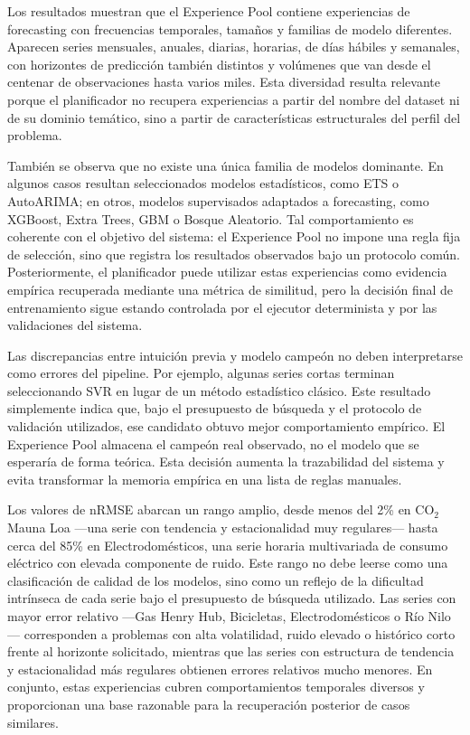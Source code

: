 \documentclass[12pt,a4paper]{article}
\theoremstyle{plain}
\begin{document}
Los resultados muestran que el Experience Pool contiene experiencias de forecasting con frecuencias temporales, tamaños y familias de modelo diferentes. Aparecen series mensuales, anuales, diarias, horarias, de días hábiles y semanales, con horizontes de predicción también distintos y volúmenes que van desde el centenar de observaciones hasta varios miles. Esta diversidad resulta relevante porque el planificador no recupera experiencias a partir del nombre del dataset ni de su dominio temático, sino a partir de características estructurales del perfil del problema.

También se observa que no existe una única familia de modelos dominante. En algunos casos resultan seleccionados modelos estadísticos, como ETS o AutoARIMA; en otros, modelos supervisados adaptados a forecasting, como XGBoost, Extra Trees, GBM o Bosque Aleatorio. Tal comportamiento es coherente con el objetivo del sistema: el Experience Pool no impone una regla fija de selección, sino que registra los resultados observados bajo un protocolo común. Posteriormente, el planificador puede utilizar estas experiencias como evidencia empírica recuperada mediante una métrica de similitud, pero la decisión final de entrenamiento sigue estando controlada por el ejecutor determinista y por las validaciones del sistema.

Las discrepancias entre intuición previa y modelo campeón no deben interpretarse como errores del pipeline. Por ejemplo, algunas series cortas terminan seleccionando SVR en lugar de un método estadístico clásico. Este resultado simplemente indica que, bajo el presupuesto de búsqueda y el protocolo de validación utilizados, ese candidato obtuvo mejor comportamiento empírico. El Experience Pool almacena el campeón real observado, no el modelo que se esperaría de forma teórica. Esta decisión aumenta la trazabilidad del sistema y evita transformar la memoria empírica en una lista de reglas manuales.

Los valores de nRMSE abarcan un rango amplio, desde menos del 2\% en CO$_2$ Mauna Loa ---una serie con tendencia y estacionalidad muy regulares--- hasta cerca del 85\% en Electrodomésticos, una serie horaria multivariada de consumo eléctrico con elevada componente de ruido. Este rango no debe leerse como una clasificación de calidad de los modelos, sino como un reflejo de la dificultad intrínseca de cada serie bajo el presupuesto de búsqueda utilizado. Las series con mayor error relativo ---Gas Henry Hub, Bicicletas, Electrodomésticos o Río Nilo--- corresponden a problemas con alta volatilidad, ruido elevado o histórico corto frente al horizonte solicitado, mientras que las series con estructura de tendencia y estacionalidad más regulares obtienen errores relativos mucho menores. En conjunto, estas experiencias cubren comportamientos temporales diversos y proporcionan una base razonable para la recuperación posterior de casos similares.
\end{document}
